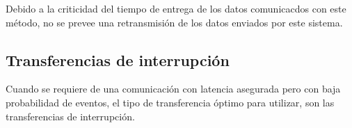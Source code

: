 	Debido a la criticidad del tiempo de entrega de los datos comunicacdos con este método, no se prevee una retransmisión de los datos enviados por este sistema.\\
	
\subsection{Transferencias de interrupción}
	Cuando se requiere de una comunicación con latencia asegurada pero con baja probabilidad de eventos, el tipo de transferencia óptimo para utilizar, son las transferencias de interrupción.